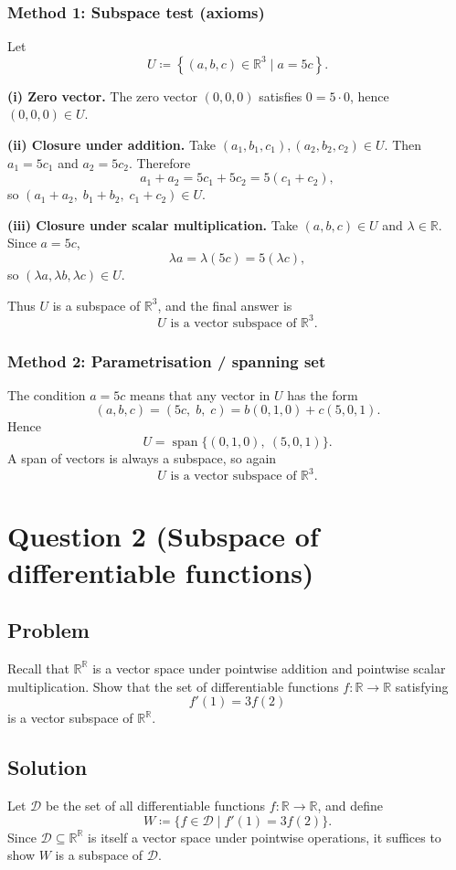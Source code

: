 \documentclass[12pt]{article}
\begin{document}
\subsubsection{Method 1: Subspace test (axioms)}
Let
\[
U \coloneqq \left\{(a,b,c)\in \mathbb{R}^3 \mid a=5c\right\}.
\]

\textbf{(i) Zero vector.} The zero vector \((0,0,0)\) satisfies \(0=5\cdot 0\), hence \((0,0,0)\in U\).

\textbf{(ii) Closure under addition.}
Take \((a_1,b_1,c_1),(a_2,b_2,c_2)\in U\). Then \(a_1=5c_1\) and \(a_2=5c_2\). Therefore
\[
a_1+a_2 = 5c_1+5c_2 = 5(c_1+c_2),
\]
so \((a_1+a_2,\; b_1+b_2,\; c_1+c_2)\in U\).

\textbf{(iii) Closure under scalar multiplication.}
Take \((a,b,c)\in U\) and \(\lambda\in \mathbb{R}\). Since \(a=5c\),
\[
\lambda a = \lambda(5c)=5(\lambda c),
\]
so \((\lambda a,\lambda b,\lambda c)\in U\).

Thus \(U\) is a subspace of \(\mathbb{R}^3\), and the final answer is
\[
\boxed{\text{\(U\) is a vector subspace of \(\mathbb{R}^3\).}}
\]

\subsubsection{Method 2: Parametrisation / spanning set}
The condition \(a=5c\) means that any vector in \(U\) has the form
\[
(a,b,c)=(5c,\; b,\; c)= b(0,1,0)+c(5,0,1).
\]
Hence
\[
U = \operatorname{span}\{(0,1,0),\ (5,0,1)\}.
\]
A span of vectors is always a subspace, so again
\[
\boxed{\text{\(U\) is a vector subspace of \(\mathbb{R}^3\).}}
\]

\newpage
\section{Question 2 (Subspace of differentiable functions)}
\subsection{Problem}
Recall that \(\mathbb{R}^{\mathbb{R}}\) is a vector space under pointwise addition and pointwise scalar multiplication.
Show that the set of differentiable functions \(f:\mathbb{R}\to\mathbb{R}\) satisfying
\[
f'(1)=3f(2)
\]
is a vector subspace of \(\mathbb{R}^{\mathbb{R}}\).

\subsection{Solution}
Let \(\mathcal{D}\) be the set of all differentiable functions \(f:\mathbb{R}\to\mathbb{R}\), and define
\[
W \coloneqq \{ f\in \mathcal{D} \mid f'(1)=3f(2)\}.
\]
Since \(\mathcal{D}\subseteq \mathbb{R}^{\mathbb{R}}\) is itself a vector space under pointwise operations, it suffices to show \(W\) is a subspace of \(\mathcal{D}\).
\end{document}
